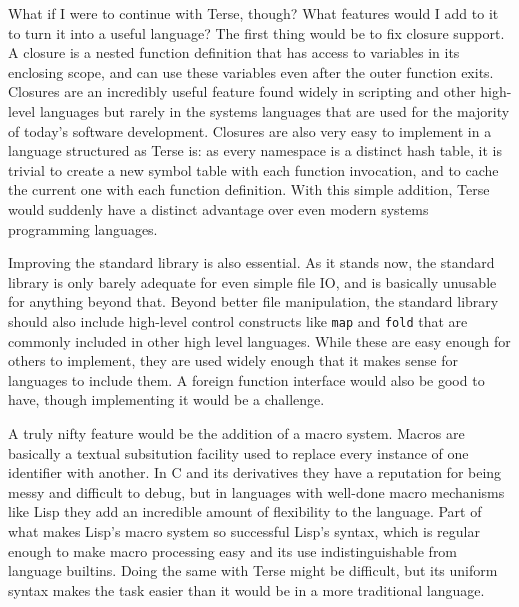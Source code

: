 \documentclass[12pt]{report}
\newcommand{\code}[1]{\texttt{#1}}
\begin{document}
What if I were to continue with Terse, though? What features would I
add to it to turn it into a useful language? The first thing would be
to fix closure support. A closure is a nested function definition that
has access to variables in its enclosing scope, and can use these
variables even after the outer function exits. Closures are an
incredibly useful feature found widely in scripting and other
high-level languages but rarely in the systems languages that are used
for the majority of today's software
development\footnotemark{}. Closures are also very easy to implement
in a language structured as Terse is: as every namespace is a distinct
hash table, it is trivial to create a new symbol table with each
function invocation, and to cache the current one with each function
definition. With this simple addition, Terse would suddenly have a
distinct advantage over even modern systems programming languages.


Improving the standard library is also essential. As it stands now,
the standard library is only barely adequate for even simple file IO,
and is basically unusable for anything beyond that. Beyond better file
manipulation, the standard library should also include high-level
control constructs like \code{map} and \code{fold} that are commonly
included in other high level languages. While these are easy enough
for others to implement, they are used widely enough that it makes
sense for languages to include them. A foreign function
interface\footnotemark{} would also be good to have, though
implementing it would be a challenge.


A truly nifty feature would be the addition of a macro system. Macros
are basically a textual subsitution facility used to replace every
instance of one identifier with another. In C and its derivatives they
have a reputation for being messy and difficult to debug, but in
languages with well-done macro mechanisms like Lisp they add an
incredible amount of flexibility to the language. Part of what makes
Lisp's macro system so successful Lisp's syntax, which is regular
enough to make macro processing easy and its use indistinguishable
from language builtins. Doing the same with Terse might be difficult,
but its uniform syntax makes the task easier than it would be in a
more traditional language.
\end{document}
